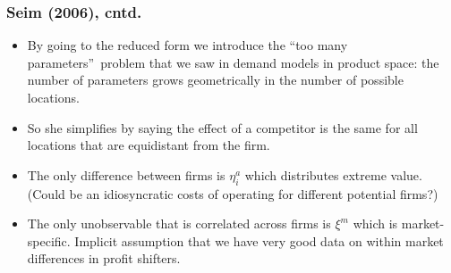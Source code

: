 \documentclass[notes=show]{beamer}
\begin{document}
\begin{frame}%

\frametitle{Seim (2006), cntd.}

\begin{itemize}
\item By going to the reduced form we introduce the \textquotedblleft too
many parameters\textquotedblright\ problem that we saw in demand models in
product space: the number of parameters grows geometrically in the number of
possible locations.

\item So she simplifies by saying the effect of a competitor is the same for
all locations that are equidistant from the firm.

\item The only difference between firms is $\eta _{i}^{a}$ which distributes
extreme value. (Could be an idiosyncratic costs of operating for different
potential firms?)

\item The only unobservable that is correlated across firms is $\xi ^{m}$
which is market-specific. Implicit assumption that we have very good data on
within market differences in profit shifters.
\end{itemize}

\end{frame}%
\end{document}
